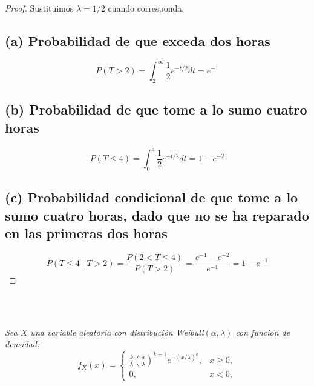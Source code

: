 \documentclass[11pt,letterpaper]{article}
\begin{document}
\begin{proof}
Sustituimos \( \lambda = 1/2 \) cuando corresponda.
\subsection*{(a) Probabilidad de que exceda dos horas}
\[
P(T > 2) = \int_2^\infty \frac{1}{2} e^{-t/2} dt = e^{-1}
\]
\subsection*{(b) Probabilidad de que tome a lo sumo cuatro horas}
\[
P(T \leq 4) = \int_0^4 \frac{1}{2} e^{-t/2} dt = 1 - e^{-2}
\]
\subsection*{(c) Probabilidad condicional de que tome a lo sumo cuatro horas, dado que no se ha reparado en las primeras dos horas}
\[
P(T \leq 4 \mid T > 2) = \frac{P(2 < T \leq 4)}{P(T > 2)} = \frac{e^{-1} - e^{-2}}{e^{-1}} = 1 - e^{-1}
\]
\end{proof}\,\\
\,\\
\begin{tcolorbox}[
	title = \textcolor{black}{\textcolor{white}{Problema 5}},]
\textit{Sea $X$ una variable aleatoria con distribuci\'on Weibull$(\alpha,\lambda)$ con funci\'on de densidad: 
$${f_X(x)={\begin{cases}{\frac {k}{\lambda }}\left({\frac {x}{\lambda }}\right)^{k-1}e^{-(x/\lambda )^{k}},&x\geq 0,\\0,&x<0,\end{cases}}}$$}
\end{tcolorbox}
\end{document}
